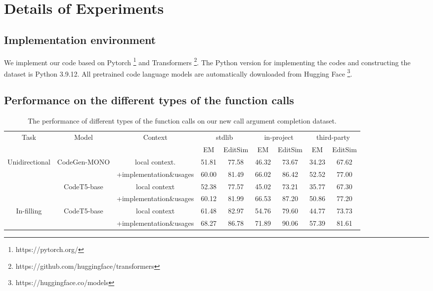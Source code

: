 \section{Details of Experiments}

\subsection{Implementation environment} 
We implement our code based on Pytorch \footnote{https://pytorch.org/} and Transformers \footnote{https://github.com/huggingface/transformers}. The Python version for implementing the codes and constructing the dataset is Python 3.9.12. All pretrained code language models are automatically downloaded from Hugging Face \footnote{https://huggingface.co/models}. 

\subsection{Performance on the different types of the function calls}
\begin{table}[ht]
\centering
\begin{tabular}{ccccccccc}
\toprule
\multirow{2}{*}{Task} & \multirow{2}{*}{Model} & \multirow{2}{*}{Context}  & \multicolumn{2}{c}{stdlib} & \multicolumn{2}{c}{in-project} & \multicolumn{2}{c}{third-party} \\
\cmidrule{4-9}
                      &                        &                          & EM      & EditSim   & EM    & EditSim        & EM         & EditSim \\
\midrule
Unidirectional        & CodeGen-MONO          & local context.            & 51.81   & 77.58     & 46.32 & 73.67           & 34.23         & 67.62   \\
                      &                        & +implementation\&usages  & 60.00   & 81.49     & 66.02 & 86.42           & 52.52         & 77.00   \\
                      & CodeT5-base            & local context            & 52.38   & 77.57     & 45.02 & 73.21           & 35.77         & 67.30   \\
                      &                        & +implementation\&usages  & 60.12   & 81.99     & 66.53 & 87.20           & 50.86         & 77.20   \\
\midrule
In-filling            & CodeT5-base            & local context            & 61.48   & 82.97     & 54.76 & 79.60           & 44.77         & 73.73   \\
                      &                        & +implementation\&usages  & 68.27   & 86.78     & 71.89 & 90.06           & 57.39         & 81.61   \\
\bottomrule
\end{tabular}
\caption{The performance of different types of the function calls on our new call argument completion dataset.}
\label{tab:types}
\end{table}


